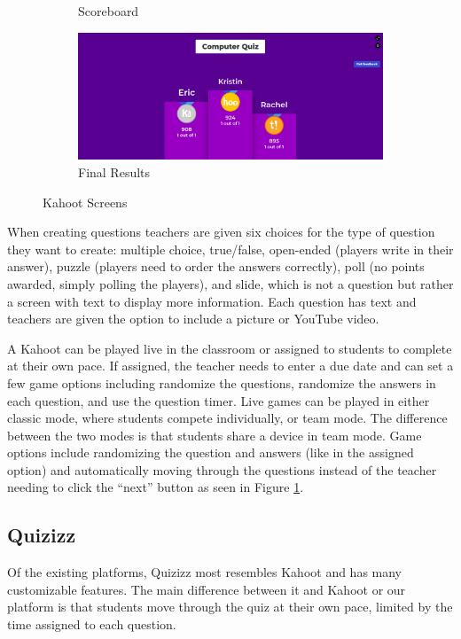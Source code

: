 \documentclass{article}
\begin{document}
\begin{figure}[ht]
\begin{subfigure}[b]{0.49\textwidth}
                \caption{Scoreboard}
                \label{fig:kahoot-scoreboard}
            \end{subfigure}
            \begin{subfigure}[b]{0.49\textwidth}
                \includegraphics[width=\textwidth]{images/kahoot-finished.png}
                \caption{Final Results}
                \label{fig:kahoot-final}
            \end{subfigure}
            \caption{Kahoot Screens \cite{kahoot}}\label{fig:kahoot}
        \end{figure}
        
        When creating questions teachers are given six choices for the type of question they want to create: multiple choice, true/false, open-ended (players write in their answer), puzzle (players need to order the answers correctly), poll (no points awarded, simply polling the players), and slide, which is not a question but rather a screen with text to display more information. Each question has text and teachers are given the option to include a picture or YouTube video.
        \smallskip
        
        A Kahoot can be played live in the classroom or assigned to students to complete at their own pace. If assigned, the teacher needs to enter a due date and can set a few game options including randomize the questions, randomize the answers in each question, and use the question timer. Live games can be played in either classic mode, where students compete individually, or team mode. The difference between the two modes is that students share a device in team mode. Game options include randomizing the question and answers (like in the assigned option) and automatically moving through the questions instead of the teacher needing to click the ``next'' button as seen in Figure \ref{fig:kahoot-scoreboard}.

    \subsection{Quizizz}
        Of the existing platforms, Quizizz most resembles Kahoot and has many customizable features. The main difference between it and Kahoot or our platform is that students move through the quiz at their own pace, limited by the time assigned to each question.
        \smallskip
        
\end{document}

